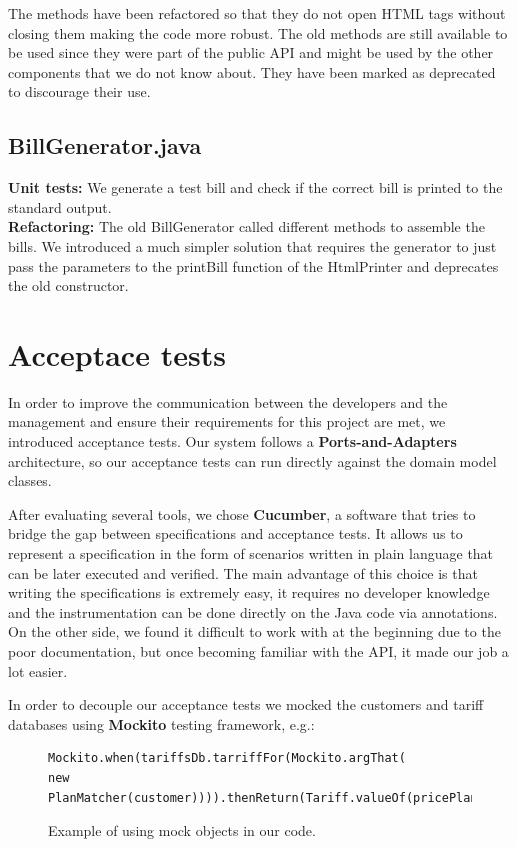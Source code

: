 \documentclass[a4paper]{article}
\begin{document}
The methods have been refactored so that they do not open HTML tags without closing them making the code more robust. The old methods are still available to be used since they were part of the public API and might be used by the other components that we do not know about. They have been marked as deprecated to discourage their use. 

\subsection{BillGenerator.java}
{\bf Unit tests:} We generate a test bill and check if the correct bill is printed to the standard output.
\\{\bf Refactoring:} The old BillGenerator called different methods to assemble the bills. We introduced a much simpler solution that requires the generator to just pass the parameters to the printBill function of the HtmlPrinter and deprecates the old constructor.







\section{Acceptace tests}
In order to improve the communication between the developers and the management and ensure their requirements for this project are met, we introduced acceptance tests. Our system follows a {\bf Ports-and-Adapters} architecture, so our acceptance tests can run directly against the domain model classes.

After evaluating several tools, we chose {\bf Cucumber}, a software that tries to bridge the gap between specifications and acceptance tests. It allows us to represent a specification in the form of scenarios written in plain language that can be later executed and verified. The main advantage of this choice is that writing the specifications is extremely easy, it requires no developer knowledge and the instrumentation can be done directly on the Java code via annotations. On the other side, we found it difficult to work with at the beginning due to the poor documentation, but once becoming familiar with the API, it made our job a lot easier.

In order to decouple our acceptance tests we mocked the customers and tariff databases using {\bf Mockito} testing framework, e.g.:

\begin{figure}[h]
\begin{verbatim}
Mockito.when(tariffsDb.tarriffFor(Mockito.argThat(
new PlanMatcher(customer)))).thenReturn(Tariff.valueOf(pricePlan));
\end{verbatim}
\caption{Example of using mock objects in our code.}
\end{figure}
\end{document}
